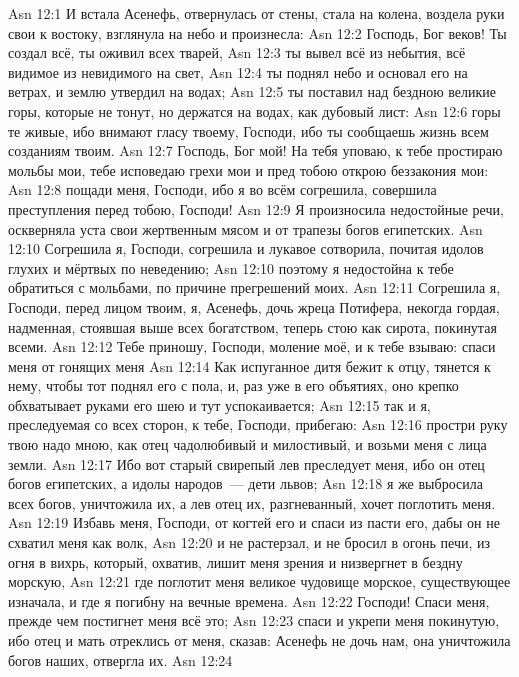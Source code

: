 \vs Asn 12:1
И встала Асенефь, отвернулась от стены,
стала на колена, воздела руки свои к востоку,
взглянула на небо и произнесла:
\vs Asn 12:2
Господь, Бог веков!
Ты создал всё, ты оживил всех тварей,
\vs Asn 12:3
ты вывел всё из небытия,
всё видимое из невидимого на свет,
\vs Asn 12:4
ты поднял небо и основал его
на ветрах, и землю утвердил на водах;
\vs Asn 12:5
ты поставил над бездною великие горы,
которые не тонут, но держатся на водах, как дубовый лист:
\vs Asn 12:6
горы те живые, ибо внимают гласу твоему,
Господи, ибо ты сообщаешь жизнь всем созданиям твоим.
\vs Asn 12:7
Господь, Бог мой!
На тебя уповаю, к тебе простираю мольбы мои,
тебе исповедаю грехи мои
и пред тобою открою беззакония мои:
\vs Asn 12:8
пощади меня, Господи,
ибо я во всём согрешила,
совершила преступления перед тобою, Господи!
\vs Asn 12:9
Я произносила недостойные речи,
оскверняла уста свои жертвенным мясом
и от трапезы богов египетских.
\vs Asn 12:10
Согрешила я, Господи,
согрешила и лукавое сотворила,
почитая идолов глухих и мёртвых по неведению;
\vs Asn 12:10
поэтому я недостойна к тебе обратиться с мольбами,
по причине прегрешений моих.
\vs Asn 12:11
Согрешила я, Господи, перед лицом твоим,
я, Асенефь, дочь жреца Потифера,
некогда гордая, надменная,
стоявшая выше всех богатством,
теперь стою как сирота, покинутая всеми.
\vs Asn 12:12
Тебе приношу, Господи, моление моё,
и к тебе взываю: спаси меня от гонящих меня
\vs Asn 12:14
Как испуганное дитя бежит к отцу,
тянется к нему, чтобы тот поднял его с пола,
и, раз уже в его объятиях,
оно крепко обхватывает руками
его шею и тут успокаивается;
\vs Asn 12:15
так и я, преследуемая со всех сторон,
к тебе, Господи, прибегаю:
\vs Asn 12:16
простри руку твою надо мною,
как отец чадолюбивый и милостивый,
и возьми меня с лица земли.
\vs Asn 12:17
Ибо вот старый свирепый лев преследует меня,
ибо он отец богов египетских, а идолы народов~--- дети львов;
\vs Asn 12:18
я же выбросила всех богов,
уничтожила их, а лев отец их,
разгневанный, хочет поглотить меня.
\vs Asn 12:19
Избавь меня, Господи, от когтей его
и спаси из пасти его, дабы он не схватил меня как волк,
\vs Asn 12:20
и не растерзал, и не бросил в огонь печи,
из огня в вихрь, который, охватив,
лишит меня зрения и низвергнет в бездну морскую,
\vs Asn 12:21
где поглотит меня великое чудовище морское,
существующее изначала, и где я погибну на вечные времена.
\vs Asn 12:22
Господи!
Спаси меня, прежде чем постигнет меня всё это;
\vs Asn 12:23
спаси и укрепи меня покинутую,
ибо отец и мать отреклись от меня, сказав:
Асенефь не дочь нам, она уничтожила богов наших,
отвергла их.
\vs Asn 12:24
